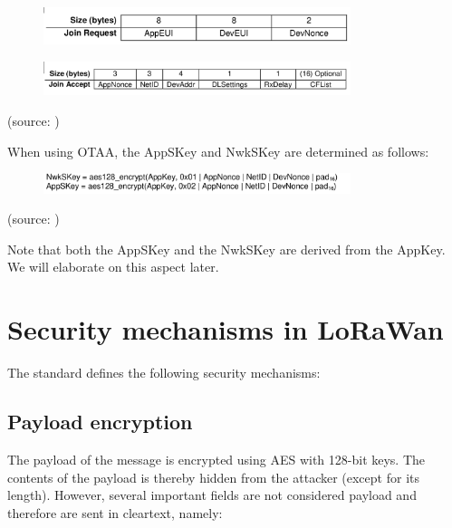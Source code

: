 \begin{figure}[h!]
{\includegraphics[width=0.8\textwidth]{images/image16.png}}
\end{figure}

\begin{figure}[h!]
{\includegraphics[width=0.8\textwidth]{images/image6.png}}
\end{figure}
{(source: \cite{spec})}


{When using OTAA, the AppSKey and NwkSKey are determined as follows:}

\begin{figure}[h!]
{\includegraphics[width=0.8\textwidth]{images/image4.png}}
\end{figure}
{(source: \cite{spec})}

{Note that both the AppSKey and the NwkSKey are derived from the AppKey.
We will elaborate on this aspect later.}

\section{Security mechanisms in LoRaWan}

{The standard defines the following security mechanisms:}

\subsection{Payload encryption}

{The payload of the message is encrypted using AES with 128-bit keys.
The contents of the payload is thereby hidden from the attacker (except
for its length). However, several important fields are
not considered payload and therefore are sent in cleartext, namely:}

